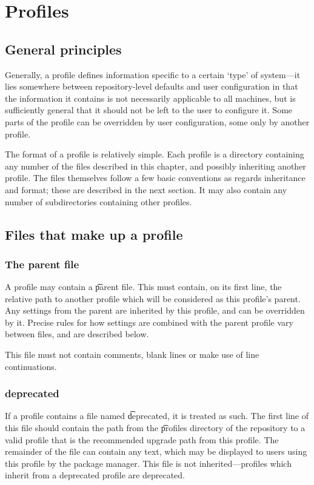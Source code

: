 \chapter{Profiles}
\label{profiles}

\section{General principles}
Generally, a profile defines information specific to a certain `type' of system---it lies somewhere
between repository-level defaults and user configuration in that the information it contains is not
necessarily applicable to all machines, but is sufficiently general that it should not be left to
the user to configure it. Some parts of the profile can be overridden by user configuration, some
only by another profile.

The format of a profile is relatively simple. Each profile is a directory containing any number of
the files described in this chapter, and possibly inheriting another profile. The files themselves
follow a few basic conventions as regards inheritance and format; these are described in the next
section. It may also contain any number of subdirectories containing other profiles.

\section{Files that make up a profile}
\subsection{The parent file}
A profile may contain a \t{parent} file. This must contain, on its first line, the relative path to
another profile which will be considered as this profile's parent. Any settings from the parent are
inherited by this profile, and can be overridden by it. Precise rules for how settings are combined
with the parent profile vary between files, and are described below.

This file must not contain comments, blank lines or make use of line continuations.

\subsection{deprecated}
If a profile contains a file named \t{deprecated}, it is treated as such. The first line of this
file should contain the path from the \t{profiles} directory of the repository to a valid profile
that is the recommended upgrade path from this profile. The remainder of the file can contain any
text, which may be displayed to users using this profile by the package manager. This file is not
inherited---profiles which inherit from a deprecated profile are  deprecated.

